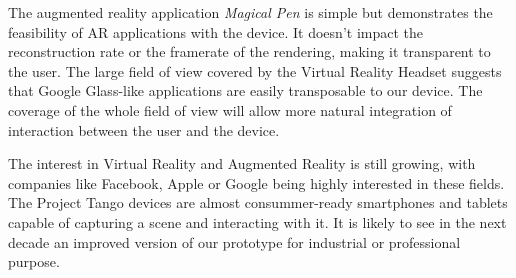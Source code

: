 \documentclass[12pt, twoside]{article}
\begin{document}
The augmented reality application \textit{Magical Pen} is simple but demonstrates the feasibility of AR applications with the device. It doesn't impact the reconstruction rate or the framerate of the rendering, making it transparent to the user. The large field of view covered by the Virtual Reality Headset suggests that Google Glass-like applications are easily transposable to our device. The coverage of the whole field of view will allow more natural integration of interaction between the user and the device.

The interest in Virtual Reality and Augmented Reality is still growing, with companies like Facebook, Apple or Google being highly interested in these fields. The Project Tango devices are almost consummer-ready smartphones and tablets capable of capturing a scene and interacting with it. It is likely to see in the next decade an improved version of our prototype for industrial or professional purpose.


\newpage


\end{document}

